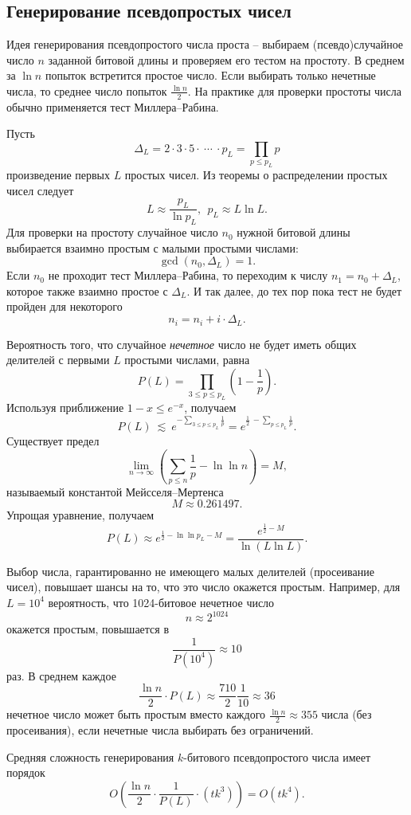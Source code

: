 \subsection{Генерирование псевдопростых чисел}

Идея генерирования псевдопростого числа проста -- выбираем (псевдо)случайное число $n$ заданной битовой длины и проверяем его тестом на простоту. В среднем за $\ln n$ попыток встретится простое число. Если выбирать только нечетные числа, то среднее число попыток $\frac{\ln n}{2}$. На практике для проверки простоты числа обычно применяется тест Миллера--Рабина.

Пусть
    \[ \Delta_L = 2 \cdot 3 \cdot 5 \cdot ~\cdots~ \cdot p_L = \prod \limits_{p \leq p_L} p \]
произведение первых $L$ простых чисел. Из теоремы о распределении простых чисел следует
    \[ L \approx \frac{p_L}{\ln p_L}, ~~ p_L \approx L \ln L. \]
Для проверки на простоту случайное число $n_0$ нужной битовой длины выбирается взаимно простым с малыми простыми числами:
    \[ \gcd(n_0, \Delta_L) = 1. \]
Если $n_0$ не проходит тест Миллера--Рабина, то переходим к числу $n_1 = n_0 + \Delta_L$, которое также взаимно простое с $\Delta_L$. И так далее, до тех пор пока тест не будет пройден  для некоторого
    \[ n_i = n_i + i \cdot \Delta_L. \]

Вероятность того, что случайное \textit{нечетное} число не будет иметь общих делителей с первыми $L$ простыми числами, равна
    \[ P(L) = \prod \limits_{3 \leq p \leq p_L} \left( 1 - \frac{1}{p} \right). \]
Используя приближение $1-x \leq e^{-x}$, получаем
    \[ P(L) ~\lesssim~ e^{-\sum\limits_{3 \leq p \leq p_L} \frac{1}{p}} = e^{\frac{1}{2} ~ - \sum\limits_{p \leq p_L} \frac{1}{p}}. \]
Существует предел
    \[ \lim \limits_{n \rightarrow \infty} \left( \sum \limits_{p \leq n} \frac{1}{p} - \ln \ln n \right) = M, \]
называемый константой Мейсселя--Мертенса
    \[ M \approx 0.261497. \]
Упрощая уравнение, получаем
    \[ P(L) \approx e^{\frac{1}{2} - \ln \ln p_L - M} = \frac{e^{\frac{1}{2} - M}}{\ln(L \ln L)}. \]

Выбор числа, гарантированно не имеющего малых делителей (просеивание чисел), повышает шансы на то, что это число окажется простым. Например, для $L = 10^4$ вероятность, что 1024-битовое нечетное число
    \[ n \approx 2^{1024} \]
окажется простым, повышается в
    \[ \frac{1}{P(10^4)} \approx 10 \]
раз. В среднем каждое
    \[ \frac{\ln n}{2} \cdot P(L) \approx \frac{710}{2} \frac{1}{10} \approx 36 \]
нечетное число может быть простым вместо каждого $\frac{\ln n}{2} \approx 355$ числа (без просеивания), если нечетные числа выбирать без ограничений.

Средняя сложность генерирования $k$-битового псевдопростого числа имеет порядок
    \[ O \left( \frac{\ln n}{2} \cdot \frac{1}{P(L)} \cdot \left( t k^3 \right) \right) = O(t k^4). \]
